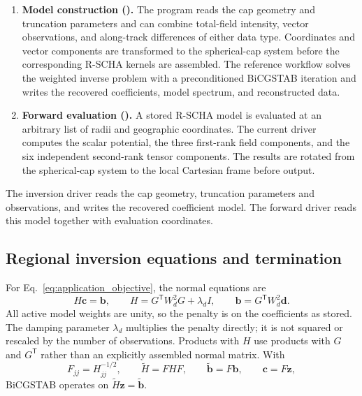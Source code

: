 ﻿\documentclass[11pt,a4paper]{article}
\newcommand{\RSCHA}{\textsc{R-SCHA}\xspace}
\begin{document}
\begin{enumerate}[leftmargin=2.2em]
\item \textbf{Model construction ().} The program reads the cap geometry and truncation parameters and can combine total-field intensity, vector observations, and along-track differences of either data type. Coordinates and vector components are transformed to the spherical-cap system before the corresponding \RSCHA kernels are assembled. The reference workflow solves the weighted inverse problem with a preconditioned BiCGSTAB iteration and writes the recovered coefficients, model spectrum, and reconstructed data.

\item \textbf{Forward evaluation ().} A stored \RSCHA model is evaluated at an arbitrary list of radii and geographic coordinates. The current driver computes the scalar potential, the three first-rank field components, and the six independent second-rank tensor components. The results are rotated from the spherical-cap system to the local Cartesian frame before output.

\end{enumerate}

The inversion driver reads the cap geometry, truncation parameters and observations, and writes the recovered coefficient model. The forward driver reads this model together with evaluation coordinates.

\subsection{Regional inversion equations and termination}
\label{app:inversion_details}

For Eq.~\eqref{eq:application_objective}, the normal equations are
\begin{equation}
 H\boldsymbol c=\boldsymbol b,\qquad
 H=G^{\mathsf T}W_d^2G+\lambda_d I,\qquad
 \boldsymbol b=G^{\mathsf T}W_d^2\boldsymbol d.
 \label{eq:application_normal}
\end{equation}
All active model weights are unity, so the penalty is on the coefficients as stored. The damping parameter $\lambda_d$ multiplies the penalty directly; it is not squared or rescaled by the number of observations. Products with $H$ use products with $G$ and $G^{\mathsf T}$ rather than an explicitly assembled normal matrix. With
\begin{equation}
 F_{jj}=H_{jj}^{-1/2},\qquad
 \widetilde H=FHF,\qquad \widetilde{\boldsymbol b}=F\boldsymbol b,
 \qquad \boldsymbol c=F\boldsymbol z,
 \label{eq:application_preconditioner}
\end{equation}
BiCGSTAB operates on $\widetilde H\boldsymbol z=\widetilde{\boldsymbol b}$.
\end{document}
